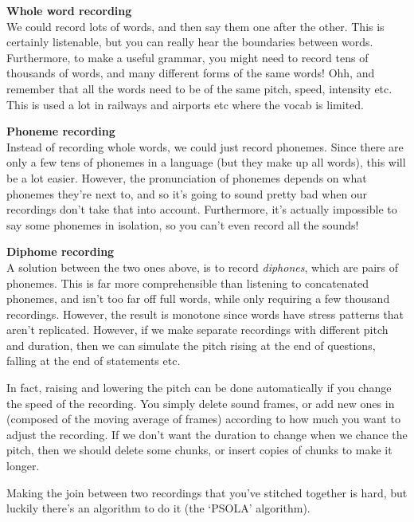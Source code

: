 \begin{description}
  \item \textbf{Whole word recording}\\
  We could record lots of words, and then say them one after  the other. This is
  certainly listenable, but you can really hear the  boundaries between words.
  Furthermore, to make a useful grammar, you might  need to record tens of
  thousands of words, and many different forms of the  same words! Ohh, and
  remember that all the words need to be of the same pitch,  speed, intensity
  etc. This is used a lot in railways and airports etc where  the vocab is
  limited.

  \item \textbf{Phoneme recording}\\
  Instead of recording whole words, we could just record phonemes. Since there
  are only a few tens of phonemes in a language (but they make up all words),
  this will be a lot easier. However, the pronunciation of phonemes depends on
  what phonemes they're next to, and so it's going to sound pretty bad when our
  recordings don't take that into account. Furthermore, it's actually impossible
  to say some phonemes in isolation, so you can't even record all the sounds!

  \item \textbf{Diphome recording}\\
  A solution between the two ones above, is to record \textit{diphones}, which
  are pairs of phonemes. This is far more comprehensible than listening to
  concatenated phonemes, and isn't too far off full words, while only requiring
  a few thousand recordings. However, the result is monotone since words have
  stress patterns that aren't replicated. However, if we make separate
  recordings with different pitch and duration, then we can simulate the pitch
  rising at the end of questions, falling at the end of statements etc.

  In fact, raising and lowering the pitch can be done automatically if you
  change the speed of the recording. You simply delete sound frames, or add new
  ones in (composed of the moving average of frames) according to how much you
  want to adjust the recording. If we don't want the duration to change when we
  chance the pitch, then we should delete some chunks, or insert copies of
  chunks to make it longer.
\end{description}

Making the join between two recordings that you've stitched together is hard, but
luckily there's an algorithm to do it (the `PSOLA' algorithm).


